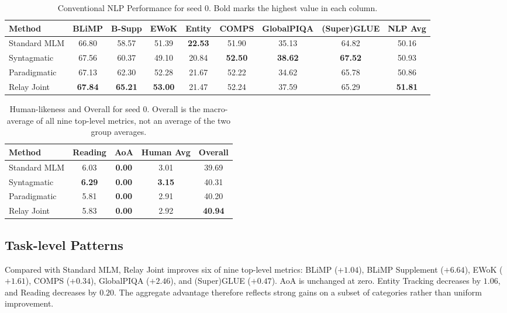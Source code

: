 \documentclass[11pt,a4paper]{article}
\newcommand{\standardmlm}{Standard MLM}
\newcommand{\syntagmatic}{Syntagmatic}
\newcommand{\paradigmatic}{Paradigmatic}
\newcommand{\relayjoint}{Relay Joint}
\begin{document}
\begin{table}[t]
\centering
\scriptsize
\setlength{\tabcolsep}{3.2pt}
\renewcommand{\arraystretch}{1.12}
\begin{tabular}{lcccccccc}
\toprule
Method & BLiMP & B-Supp & EWoK & Entity & COMPS & GlobalPIQA & (Super)GLUE & NLP Avg \\
\midrule
\standardmlm & 66.80 & 58.57 & 51.39 & \textbf{22.53} & 51.90 & 35.13 & 64.82 & 50.16 \\
\syntagmatic & 67.56 & 60.37 & 49.10 & 20.84 & \textbf{52.50} & \textbf{38.62} & \textbf{67.52} & 50.93 \\
\paradigmatic & 67.13 & 62.30 & 52.28 & 21.67 & 52.22 & 34.62 & 65.78 & 50.86 \\
\relayjoint & \textbf{67.84} & \textbf{65.21} & \textbf{53.00} & 21.47 & 52.24 & 37.59 & 65.29 & \textbf{51.81} \\
\bottomrule
\end{tabular}
\caption{Conventional NLP Performance for seed 0. Bold marks the
highest value in each column.}
\label{tab:nlp-results}
\end{table}

\begin{table}[t]
\centering
\small
\setlength{\tabcolsep}{3pt}
\begin{tabular}{lcccc}
\toprule
Method & Reading & AoA & Human Avg & Overall \\
\midrule
\standardmlm & 6.03 & \textbf{0.00} & 3.01 & 39.69 \\
\syntagmatic & \textbf{6.29} & \textbf{0.00} & \textbf{3.15} & 40.31 \\
\paradigmatic & 5.81 & \textbf{0.00} & 2.91 & 40.20 \\
\relayjoint & 5.83 & \textbf{0.00} & 2.92 & \textbf{40.94} \\
\bottomrule
\end{tabular}
\caption{Human-likeness and Overall for seed 0. Overall is the
macro-average of all nine top-level metrics, not an average of the two
group averages.}
\label{tab:human-results}
\end{table}

\subsection{Task-level Patterns}
\label{sec:task-patterns}

Compared with Standard MLM, Relay Joint improves six of nine
top-level metrics: BLiMP ($+1.04$), BLiMP Supplement ($+6.64$), EWoK
($+1.61$), COMPS ($+0.34$), GlobalPIQA ($+2.46$), and (Super)GLUE
($+0.47$). AoA is unchanged at zero. Entity Tracking decreases by
$1.06$, and Reading decreases by $0.20$. The aggregate advantage
therefore reflects strong gains on a subset of categories rather than
uniform improvement.
\end{document}
